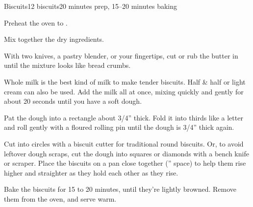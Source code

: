 \documentclass[../Cookbook.tex]{subfiles}
\begin{document}
\begin{recipe}[Biscuits]{Biscuits}{12 biscuits}{20 minutes prep, 15--20 minutes baking}

Preheat the oven to .


Mix together the dry ingredients.

With two knives, a pastry blender, or your fingertips, cut or rub the butter in until the mixture looks like bread crumbs.

Whole milk is the best kind of milk to make tender biscuits. Half \& half or light cream can also be used.
Add the milk all at once, mixing quickly and gently for about 20 seconds until you have a soft dough.

Pat the dough into a rectangle about 3/4'' thick. Fold it into thirds like a letter and roll gently with a floured rolling pin until the dough is 3/4'' thick again.

Cut into circles with a biscuit cutter for traditional round biscuits. Or, to avoid leftover dough scraps, cut the dough into squares or diamonds with a bench knife or scraper.
Place the biscuits on a pan close together ('' space) to help them rise higher and straighter as they hold each other as they rise.

Bake the biscuits for 15 to 20 minutes, until they're lightly browned. Remove them from the oven, and serve warm.


\end{recipe}
\end{document}
